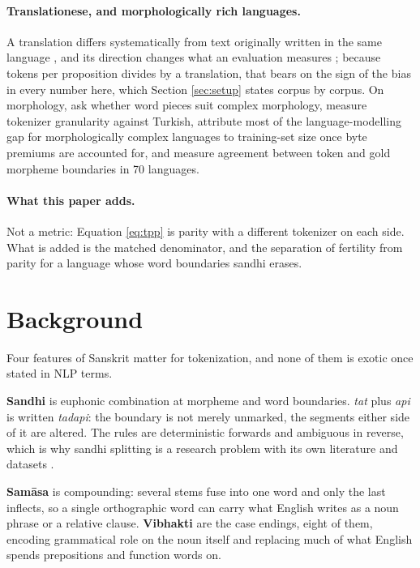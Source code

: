 \documentclass[11pt]{article}
\begin{document}
\paragraph{Translationese, and morphologically rich languages.} A translation differs
systematically from text originally written in the same language
\citep{koppel-ordan-2011-translationese,volansky-etal-2015-features}, and its direction
changes what an evaluation measures \citep{graham-etal-2020-statistical}; because tokens
per proposition divides by a translation, that bears on the sign of the bias in every
number here, which Section \ref{sec:setup} states corpus by corpus. On morphology,
\citet{klein-tsarfaty-2020-getting} ask whether word pieces suit complex morphology,
\citet{toraman-etal-2023-impact} measure tokenizer granularity against Turkish,
\citet{arnett-bergen-2025-language} attribute most of the language-modelling gap for
morphologically complex languages to training-set size once byte premiums are accounted
for, and \citet{arnett-etal-2025-morphscore} measure agreement between token and gold
morpheme boundaries in 70 languages.

\paragraph{What this paper adds.} Not a metric: Equation \ref{eq:tpp} is parity
\citep{petrov-etal-2023-tokenizers} with a different tokenizer on each side. What is added
is the matched denominator, and the separation of fertility from parity for a language
whose word boundaries sandhi erases.

\section{Background}
\label{sec:background}

Four features of Sanskrit matter for tokenization, and none of them is exotic once
stated in NLP terms.

\textbf{Sandhi} is euphonic combination at morpheme and word boundaries. \emph{tat} plus
\emph{api} is written \emph{tadapi}: the boundary is not merely unmarked, the segments
either side of it are altered. The rules are deterministic forwards and ambiguous in
reverse, which is why sandhi splitting is a research problem with its own literature
\citep{hellwig-nehrdich-2018-sanskrit,sandhan-etal-2022-translist,%
nehrdich-etal-2024-byt5} and datasets \citep{krishna-etal-2017-dataset}.

\textbf{Sam\=asa} is compounding: several stems fuse into one word and only the last
inflects, so a single orthographic word can carry what English writes as a noun phrase or
a relative clause. \textbf{Vibhakti} are the case endings, eight of them, encoding
grammatical role on the noun itself and replacing much of what English spends prepositions
and function words on.
\end{document}

